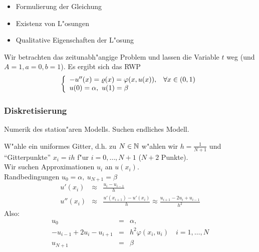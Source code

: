 \documentclass{scrartcl}
\begin{document}
\begin{itemize}
\item Formulierung der Gleichung
\item Existenz von L"osungen
\item Qualitative Eigenschaften der L"osung
\end{itemize}

Wir betrachten das zeitunabh"angige Problem und lassen die Variable $t$ weg (und $A = 1, a=0, b=1$). Es ergibt sich das RWP
$$ \left\{ \begin{array}{l l} -u''(x) = \varrho(x) = \varphi(x, u(x)), & \forall x \in (0,1) \\
u(0) = \alpha, \  u(1) = \beta\end{array} \right.$$

\subsubsection{Diskretisierung} 
Numerik des station"aren Modells. Suchen endliches Modell.

W"ahle ein uniformes Gitter, d.h. zu $N \in \mathbb{N}$ w"ahlen wir $h=\frac{1}{N+1}$ und "`Gitterpunkte"' $x_i = ih$ f"ur $i=0,\ldots,N+1$ ($N+2$ Punkte). \\
Wir suchen Approximationen $u_i$ an $u(x_i)$. \\
Randbedingungen $u_0 = \alpha, \ u_{N+1} = \beta$ 
\begin{eqnarray*}
u'(x_i) & \approx & \frac{u_i - u_{i-1}}{h} \\
u''(x_i) & \approx & \frac{u'(x_{i+1}) - u'(x_i)}{h} \approx \frac{u_{i+1} - 2u_i + u_{i-1}}{h^2}
\end{eqnarray*}
Also: 
\begin{eqnarray*}
u_0 & = & \alpha, \\
-u_{i-1} + 2u_i - u_{i+1} & = & h^2 \varphi(x_i, u_i) \quad i=1, \ldots, N \\
u_{N+1} & = & \beta
\end{eqnarray*}
\end{document}
